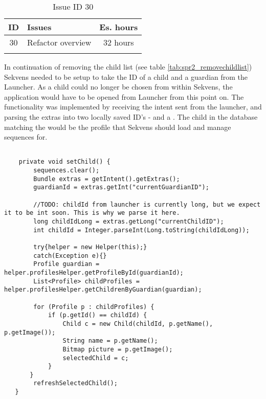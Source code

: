 \begin{longtable} { | c | p{12cm} | c | } 
\hline
	ID 	&	Issues	&		 Es. hours \\\hline
	30 	&	Refactor overview	&	32 hours \\\hline
\caption{Issue ID 30}
\label{tab:spr2_refactoroverview}
\end{longtable}

In continuation of removing the child list (see table \ref{tab:spr2_removechildlist}) Sekvens needed to be setup to take the ID of a child and a guardian from the Launcher. As a child could no longer be chosen from within Sekvens, the application would have to be opened from Launcher from this point on. The functionality was implemented by receiving the intent sent from the launcher, and parsing the extras into two locally saved ID's - and a . The child in the database matching the  would be the profile that Sekvens should load and manage sequences for.

\begin{lstlisting}[caption={A small code example of fetching the intents from Launcher}, label={lst:fetchIntent}]
    
	private void setChild() {
		sequences.clear();
		Bundle extras = getIntent().getExtras();
        guardianId = extras.getInt("currentGuardianID");

        //TODO: childId from launcher is currently long, but we expect it to be int soon. This is why we parse it here.
        long childIdLong = extras.getLong("currentChildID");
        int childId = Integer.parseInt(Long.toString(childIdLong));

        try{helper = new Helper(this);}
        catch(Exception e){}
   		Profile guardian = helper.profilesHelper.getProfileById(guardianId);
   		List<Profile> childProfiles = helper.profilesHelper.getChildrenByGuardian(guardian);

    	for (Profile p : childProfiles) {
    		if (p.getId() == childId) {
                Child c = new Child(childId, p.getName(), p.getImage());
                String name = p.getName();
                Bitmap picture = p.getImage();
                selectedChild = c;
            }
       }
        refreshSelectedChild();
   }

\end{lstlisting}